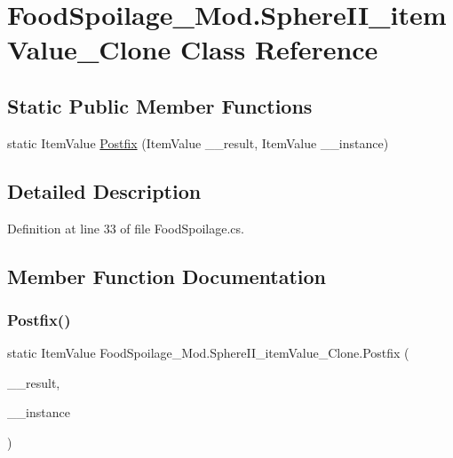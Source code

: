 \hypertarget{class_food_spoilage___mod_1_1_sphere_i_i__item_value___clone}{}\section{Food\+Spoilage\+\_\+\+Mod.\+Sphere\+I\+I\+\_\+item\+Value\+\_\+\+Clone Class Reference}
\label{class_food_spoilage___mod_1_1_sphere_i_i__item_value___clone}
\subsection*{Static Public Member Functions}
\begin{DoxyCompactItemize}
\item 
static Item\+Value \mbox{\hyperlink{class_food_spoilage___mod_1_1_sphere_i_i__item_value___clone_a6e4a82227576b40733f4a1c1b4481589}{Postfix}} (Item\+Value \+\_\+\+\_\+result, Item\+Value \+\_\+\+\_\+instance)
\end{DoxyCompactItemize}


\subsection{Detailed Description}


Definition at line 33 of file Food\+Spoilage.\+cs.



\subsection{Member Function Documentation}
\mbox{\label{class_food_spoilage___mod_1_1_sphere_i_i__item_value___clone_a6e4a82227576b40733f4a1c1b4481589}} 
\subsubsection{\texorpdfstring{Postfix()}{Postfix()}}
{\footnotesize\ttfamily static Item\+Value Food\+Spoilage\+\_\+\+Mod.\+Sphere\+I\+I\+\_\+item\+Value\+\_\+\+Clone.\+Postfix (\begin{DoxyParamCaption}\item[{Item\+Value}]{\+\_\+\+\_\+result,  }\item[{Item\+Value}]{\+\_\+\+\_\+instance }\end{DoxyParamCaption})\hspace{0.3cm}{\ttfamily [static]}}



